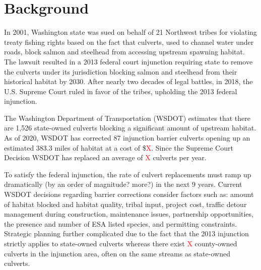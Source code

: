 \documentclass[12pt]{elsarticle}
\begin{document}


\section{Background}

In 2001, Washington state was sued on behalf of 21 Northwest tribes for violating treaty fishing rights based on the fact that culverts, used to channel water under roads, block salmon and steelhead from accessing upstream spawning habitat. The lawsuit resulted in a 2013 federal court injunction requiring state to remove the culverts under its jurisdiction blocking salmon and steelhead from their historical habitat by 2030. After nearly two decades of legal battles, in 2018, the U.S. Supreme Court ruled in favor of the tribes, upholding the 2013 federal injunction. 

The Washington Department of Transportation (WSDOT) estimates that there are 1,526 state-owned culverts blocking a significant amount of upstream habitat. As of 2020, WSDOT has corrected 87 injunction barrier culverts opening up an estimated 383.3 miles of habitat at a cost of \$\textcolor{red}{X}. Since the Supreme Court Decision WSDOT has replaced an average of \textcolor{red}{X} culverts per year. 

To satisfy the federal injunction, the rate of culvert replacements must ramp up dramatically (by an order of magnitude? more?) in the next 9 years. Current WSDOT decisions regarding barrier corrections consider factors such as: amount of habitat blocked and habitat quality, tribal input, project cost, traffic detour management during construction, maintenance issues, partnership opportunities, the presence and number of ESA listed species, and permitting constraints. Strategic planning further complicated due to the fact that the 2013 injunction strictly applies to state-owned culverts whereas there exist \textcolor{red}{X} county-owned culverts in the injunction area, often on the same streams as state-owned culverts.
\end{document}
